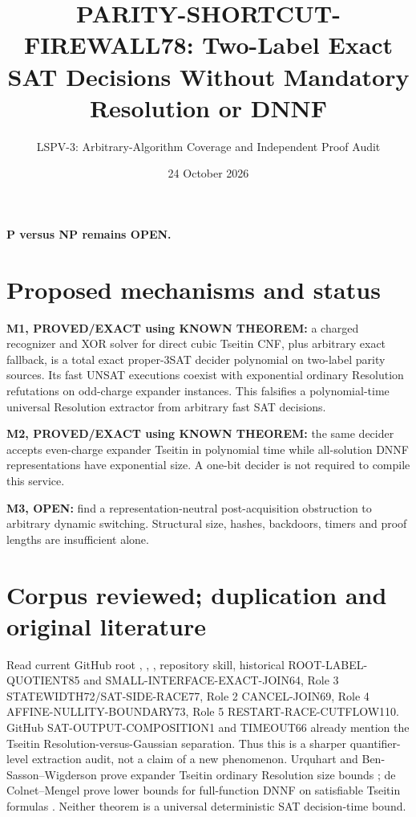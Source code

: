 \documentclass[11pt]{article}
\title{PARITY-SHORTCUT-FIREWALL78: Two-Label Exact SAT Decisions Without Mandatory Resolution or DNNF}
\author{LSPV-3: Arbitrary-Algorithm Coverage and Independent Proof Audit}
\date{24 October 2026}
\begin{document}
\maketitle
\begin{center}\textbf{P versus NP remains OPEN.}\end{center}
\section{Proposed mechanisms and status}
\noindent\textbf{M1, PROVED/EXACT using KNOWN THEOREM:} a charged recognizer and XOR solver for direct cubic Tseitin CNF, plus arbitrary exact fallback, is a total exact proper-3SAT decider polynomial on two-label parity sources. Its fast UNSAT executions coexist with exponential ordinary Resolution refutations on odd-charge expander instances. This falsifies a polynomial-time universal Resolution extractor from arbitrary fast SAT decisions.

\par\noindent\textbf{M2, PROVED/EXACT using KNOWN THEOREM:} the same decider accepts even-charge expander Tseitin in polynomial time while all-solution DNNF representations have exponential size. A one-bit decider is not required to compile this service.

\par\noindent\textbf{M3, OPEN:} find a representation-neutral post-acquisition obstruction to arbitrary dynamic switching. Structural size, hashes, backdoors, timers and proof lengths are insufficient alone.

\section{Corpus reviewed; duplication and original literature}
Read current GitHub root , , , repository skill, historical ROOT-LABEL-QUOTIENT85 and SMALL-INTERFACE-EXACT-JOIN64, Role 3 STATEWIDTH72/SAT-SIDE-RACE77, Role 2 CANCEL-JOIN69, Role 4 AFFINE-NULLITY-BOUNDARY73, Role 5 RESTART-RACE-CUTFLOW110. GitHub SAT-OUTPUT-COMPOSITION1 and TIMEOUT66 already mention the Tseitin Resolution-versus-Gaussian separation. Thus this is a sharper quantifier-level extraction audit, not a claim of a new phenomenon. Urquhart and Ben-Sasson--Wigderson prove expander Tseitin ordinary Resolution size bounds \cite{urquhart,bsw}; de Colnet--Mengel prove lower bounds for full-function DNNF on satisfiable Tseitin formulas \cite{colnet}. Neither theorem is a universal deterministic SAT decision-time bound.
\end{document}
